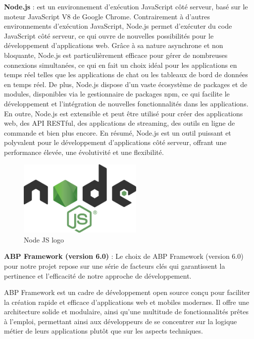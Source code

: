 \textbf{Node.js} : est un environnement d'exécution JavaScript côté serveur, basé sur le moteur JavaScript V8 de Google Chrome. Contrairement à d'autres environnements d'exécution JavaScript, Node.js permet d'exécuter du code JavaScript côté serveur, ce qui ouvre de nouvelles possibilités pour le développement d'applications web. Grâce à sa nature asynchrone et non bloquante, Node.js est particulièrement efficace pour gérer de nombreuses connexions simultanées, ce qui en fait un choix idéal pour les applications en temps réel telles que les applications de chat ou les tableaux de bord de données en temps réel. De plus, Node.js dispose d'un vaste écosystème de packages et de modules, disponibles via le gestionnaire de packages npm, ce qui facilite le développement et l'intégration de nouvelles fonctionnalités dans les applications. En outre, Node.js est extensible et peut être utilisé pour créer des applications web, des API RESTful, des applications de streaming, des outils en ligne de commande et bien plus encore. En résumé, Node.js est un outil puissant et polyvalent pour le développement d'applications côté serveur, offrant une performance élevée, une évolutivité et une flexibilité.
\\
\begin{figure}[H]
    \centering
    \includegraphics[width=6cm]{Figures/nodejs.png}
    \caption{Node JS logo}
\end{figure}






\textbf{ABP Framework (version 6.0)} : Le choix de ABP Framework (version 6.0) pour notre projet repose sur une série de facteurs clés qui garantissent la pertinence et l'efficacité de notre approche de développement.

ABP Framework est un cadre de développement open source conçu pour faciliter la création rapide et efficace d'applications web et mobiles modernes. Il offre une architecture solide et modulaire, ainsi qu'une multitude de fonctionnalités prêtes à l'emploi, permettant ainsi aux développeurs de se concentrer sur la logique métier de leurs applications plutôt que sur les aspects techniques.


